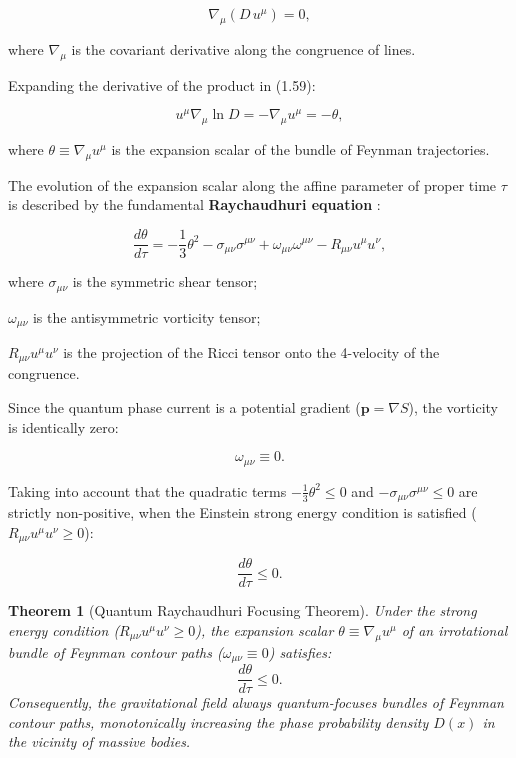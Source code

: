 \documentclass[11pt,a4paper]{article}
\newtheorem{theorem}{Theorem}[section]
\theoremstyle{definition}
\begin{document}
\begin{equation}\label{eq:1.59}\tag{1.59}
\nabla_\mu \left( D \, u^\mu \right) = 0,
\end{equation}

where $\nabla_\mu$ is the covariant derivative along the congruence of lines.

Expanding the derivative of the product in (1.59):

\begin{equation}\label{eq:1.60}\tag{1.60}
u^\mu \nabla_\mu \ln D = -\nabla_\mu u^\mu = -\theta,
\end{equation}

where $\theta \equiv \nabla_\mu u^\mu$ is the expansion scalar of the bundle of Feynman trajectories.

The evolution of the expansion scalar along the affine parameter of proper time $\tau$ is described by the fundamental \textbf{Raychaudhuri equation} \cite{ref10}:

\begin{equation}\label{eq:1.61}\tag{1.61}
\frac{d\theta}{d\tau} = -\frac{1}{3}\theta^2 - \sigma_{\mu\nu}\sigma^{\mu\nu} + \omega_{\mu\nu}\omega^{\mu\nu} - R_{\mu\nu} u^\mu u^\nu,
\end{equation}

where $\sigma_{\mu\nu}$ is the symmetric shear tensor;  

$\omega_{\mu\nu}$ is the antisymmetric vorticity tensor;  

$R_{\mu\nu} u^\mu u^\nu$ is the projection of the Ricci tensor onto the 4-velocity of the congruence.

Since the quantum phase current is a potential gradient ($\mathbf{p} = \nabla S$), the vorticity is identically zero:

\begin{equation}\label{eq:1.62}\tag{1.62}
\omega_{\mu\nu} \equiv 0.
\end{equation}

Taking into account that the quadratic terms $-\frac{1}{3}\theta^2 \le 0$ and $-\sigma_{\mu\nu}\sigma^{\mu\nu} \le 0$ are strictly non-positive, when the Einstein strong energy condition is satisfied ($R_{\mu\nu} u^\mu u^\nu \ge 0$):

\begin{equation}\label{eq:1.63}\tag{1.63}
\frac{d\theta}{d\tau} \le 0.
\end{equation}

\begin{theorem}[Quantum Raychaudhuri Focusing Theorem]\label{thm:raychaudhuri}
Under the strong energy condition ($R_{\mu\nu} u^\mu u^\nu \ge 0$), the expansion scalar $\theta \equiv \nabla_\mu u^\mu$ of an irrotational bundle of Feynman contour paths ($\omega_{\mu\nu} \equiv 0$) satisfies:
\begin{equation*}
\frac{d\theta}{d\tau} \le 0.
\end{equation*}
Consequently, the gravitational field always quantum-focuses bundles of Feynman contour paths, monotonically increasing the phase probability density $D(x)$ in the vicinity of massive bodies.
\end{theorem}
\end{document}
